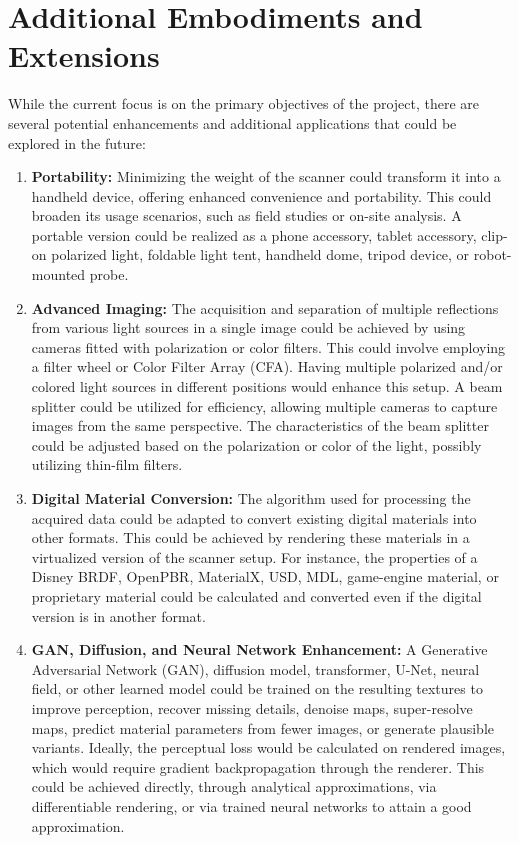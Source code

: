 \documentclass[11pt, twoside, listof=totocnumbered, bibliography=totocnumbered]{scrartcl}
\begin{document}
	\section{Additional Embodiments and Extensions}
	While the current focus is on the primary objectives of the project, there are several potential enhancements and additional applications that could be explored in the future:
	
	\begin{enumerate}
		\item \textbf{Portability:} Minimizing the weight of the scanner could transform it into a handheld device, offering enhanced convenience and portability. This could broaden its usage scenarios, such as field studies or on-site analysis. A portable version could be realized as a phone accessory, tablet accessory, clip-on polarized light, foldable light tent, handheld dome, tripod device, or robot-mounted probe.
		
		\item \textbf{Advanced Imaging:} The acquisition and separation of multiple reflections from various light sources in a single image could be achieved by using cameras fitted with polarization or color filters. This could involve employing a filter wheel or Color Filter Array (CFA). Having multiple polarized and/or colored light sources in different positions would enhance this setup. A beam splitter could be utilized for efficiency, allowing multiple cameras to capture images from the same perspective. The characteristics of the beam splitter could be adjusted based on the polarization or color of the light, possibly utilizing thin-film filters.
		
		\item \textbf{Digital Material Conversion:} The algorithm used for processing the acquired data could be adapted to convert existing digital materials into other formats. This could be achieved by rendering these materials in a virtualized version of the scanner setup. For instance, the properties of a Disney BRDF, OpenPBR, MaterialX, USD, MDL, game-engine material, or proprietary material could be calculated and converted even if the digital version is in another format.
		
		\item \textbf{GAN, Diffusion, and Neural Network Enhancement:} A Generative Adversarial Network (GAN), diffusion model, transformer, U-Net, neural field, or other learned model could be trained on the resulting textures to improve perception, recover missing details, denoise maps, super-resolve maps, predict material parameters from fewer images, or generate plausible variants. Ideally, the perceptual loss would be calculated on rendered images, which would require gradient backpropagation through the renderer. This could be achieved directly, through analytical approximations, via differentiable rendering, or via trained neural networks to attain a good approximation.
		

\end{enumerate}
\end{document}
